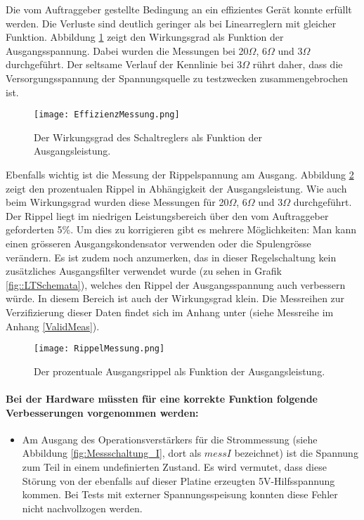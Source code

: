 Die vom Auftraggeber gestellte Bedingung an ein effizientes Gerät konnte erfüllt werden. Die Verluste sind deutlich geringer als bei Linearreglern mit gleicher Funktion. Abbildung \ref{fig:Wirkungsgrad} zeigt den Wirkungsgrad als Funktion der Ausgangsspannung. Dabei wurden die Messungen bei 20$\Omega$, 6$\Omega$ und 3$\Omega$ durchgeführt. Der seltsame Verlauf der Kennlinie bei 3$\Omega$ rührt daher, dass die Versorgungsspannung der Spannungsquelle zu testzwecken zusammengebrochen ist.

\begin{figure}[h!]
	\centering
		\texttt{[image: EffizienzMessung.png]}
	\caption{Der Wirkungsgrad des Schaltreglers als Funktion der Ausgangsleistung.}
	\label{fig:Wirkungsgrad}
\end{figure}

Ebenfalls wichtig ist die Messung der Rippelspannung am Ausgang. Abbildung \ref{fig:RippelMessung} zeigt den prozentualen Rippel in Abhängigkeit der Ausgangsleistung. Wie auch beim Wirkungsgrad wurden diese Messungen für 20$\Omega$, 6$\Omega$ und 3$\Omega$ durchgeführt. \\
Der Rippel liegt im niedrigen Leistungsbereich über den vom Auftraggeber geforderten 5\%. Um dies zu korrigieren gibt es mehrere Möglichkeiten: Man kann einen grösseren Ausgangskondensator verwenden oder die Spulengrösse verändern. Es ist zudem noch anzumerken, das in dieser Regelschaltung kein zusätzliches Ausgangsfilter verwendet wurde (zu sehen in Grafik \ref{fig::LTSchemata}), welches den Rippel der Ausgangsspannung auch verbessern würde. In diesem Bereich ist auch der Wirkungsgrad klein. Die Messreihen zur Verzifizierung dieser Daten findet sich im Anhang unter (siehe Messreihe im Anhang \ref{ValidMeas}).

\begin{figure}[h!]
	\centering
		\texttt{[image: RippelMessung.png]}
	\caption{Der prozentuale Ausgangsrippel als Funktion der Ausgangsleistung.}
	\label{fig:RippelMessung}
\end{figure}

\newpage
\paragraph{Bei der Hardware müssten für eine korrekte Funktion folgende Verbesserungen vorgenommen werden:}
\begin{itemize}
	\item Am Ausgang des Operationsverstärkers für die Strommessung (siehe Abbildung \ref{fig:Messschaltung_I}, dort als $messI$ bezeichnet) ist die Spannung zum Teil in einem undefinierten Zustand. Es wird vermutet, dass diese Störung von der ebenfalls auf dieser Platine erzeugten 5V-Hilfsspannung kommen. Bei Tests mit externer Spannungsspeisung konnten diese Fehler nicht nachvollzogen werden.
\end{itemize}